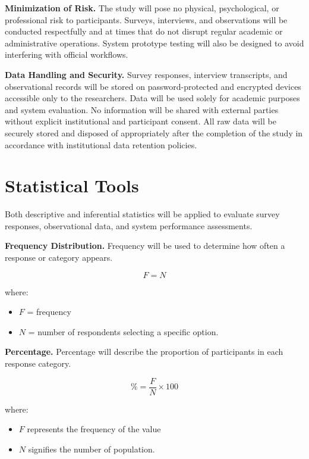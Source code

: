 \documentclass{research}
\begin{document}
\indent\textbf{Minimization of Risk.} The study will pose no physical, psychological, or professional risk to participants. Surveys, interviews, and observations will be conducted respectfully and at times that do not disrupt regular academic or administrative operations. System prototype testing will also be designed to avoid interfering with official workflows.

\indent\textbf{Data Handling and Security.} Survey responses, interview transcripts, and observational records will be stored on password-protected and encrypted devices accessible only to the researchers. Data will be used solely for academic purposes and system evaluation. No information will be shared with external parties without explicit institutional and participant consent. All raw data will be securely stored and disposed of appropriately after the completion of the study in accordance with institutional data retention policies.

\section{Statistical Tools}

\indent Both descriptive and inferential statistics will be applied to evaluate survey responses, observational data, and system performance assessments.

\indent\textbf{Frequency Distribution.} Frequency will be used to determine how often a response or category appears.

\begin{equation}
    F = N
\end{equation}

\noindent where:
\begin{itemize}
    \item[] $F$ = frequency
    \item[] $N$ = number of respondents selecting a specific option.
\end{itemize}

\indent\textbf{Percentage.} Percentage will describe the proportion of participants in each response category.

\begin{equation}
    \% = \frac{F}{N} \times 100
\end{equation}

\noindent where:
\begin{itemize}
    \item[] $F$ represents the frequency of the value
    \item[] $N$ signifies the number of population.
\end{itemize}
\end{document}
